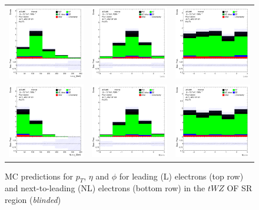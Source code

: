 \begin{figure}[htbp]
  \centering
  \begin{tabular}{ccc}


    \includegraphics[width=.2\textwidth]{figures/PreFitPlots/lep4_tWZ_4T_OF_L_el_pt} &
    \includegraphics[width=.2\textwidth]{figures/PreFitPlots/lep4_tWZ_4T_OF_L_el_eta} &
    \includegraphics[width=.2\textwidth]{figures/PreFitPlots/lep4_tWZ_4T_OF_L_el_phi} \\
    \includegraphics[width=.2\textwidth]{figures/PreFitPlots/lep4_tWZ_4T_OF_NL_el_pt} &
    \includegraphics[width=.2\textwidth]{figures/PreFitPlots/lep4_tWZ_4T_OF_NL_el_eta} &
    \includegraphics[width=.2\textwidth]{figures/PreFitPlots/lep4_tWZ_4T_OF_NL_el_phi} \\

  \end{tabular}
    \caption{MC predictions for $p_{T}$, $\eta$ and $\phi$ for leading (L) electrons (top row) and next-to-leading (NL) electrons (bottom row) in the $tWZ$ OF SR region (\textit{blinded})}
  \label{fig:4lep-OF-SR-electronPlots}
\end{figure}


